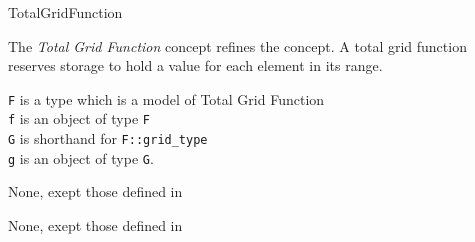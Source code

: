   
\begin{Label}{TotalGridFunction}
\end{Label}


The  {\em Total Grid Function\/} concept refines the 
 concept.
A total grid function reserves storage to hold a value for each element in
its range.


{\tt F} is a type which is a model of Total  Grid  Function 
\\
{\tt f} is an object of type  {\tt F}
\\
{\tt G} is shorthand for  {\tt F::grid\_type}
\\
{\tt g} is an object of type  {\tt G}.

\begin{ifhtml}
None, exept those defined in

None, exept those defined in
\end{ifhtml}

